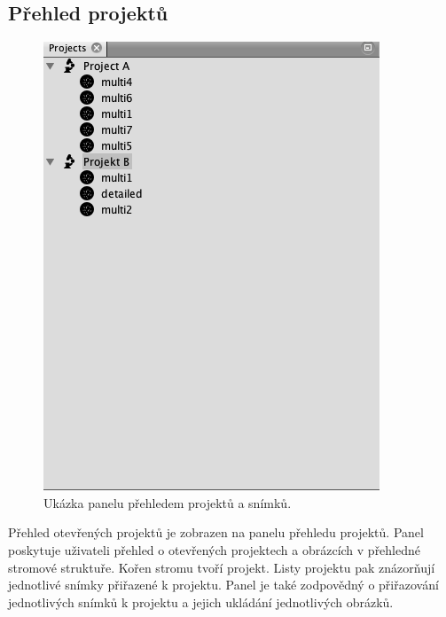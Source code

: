 \documentclass[11pt,twoside,a4paper,table]{book}
\begin{document}
\subsection{Přehled projektů}
\begin{figure}[h]
\centering
\includegraphics[scale=0.5]{figures/app_project_overview.png}
\caption{Ukázka panelu přehledem projektů a snímků.}
\end{figure}

Přehled otevřených projektů je zobrazen na panelu přehledu projektů. Panel poskytuje uživateli přehled o otevřených projektech a obrázcích v přehledné stromové struktuře. Kořen stromu tvoří projekt. Listy projektu pak znázorňují jednotlivé snímky přiřazené k projektu. Panel je také zodpovědný o přiřazování jednotlivých snímků k projektu a jejich ukládání jednotlivých obrázků.
\end{document}
